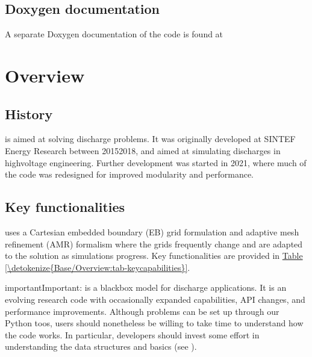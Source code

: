 \documentclass[letterpaper,10pt,english]{sphinxmanual}
\begin{document}
\subsection{Doxygen documentation}
\label{\detokenize{Base/Documentation:doxygen-documentation}}
A separate Doxygen documentation of the  code is found at 


\section{Overview}
\label{\detokenize{Base/Overview:overview}}\label{\detokenize{Base/Overview:chap-overview}}\label{\detokenize{Base/Overview::doc}}

\subsection{History}
\label{\detokenize{Base/Overview:history}}
 is aimed at solving discharge problems.
It was originally developed at SINTEF Energy Research between 2015\sphinxhyphen{}2018, and aimed at simulating discharges in high\sphinxhyphen{}voltage engineering.
Further development was started in 2021, where much of the code was redesigned for improved modularity and performance.


\subsection{Key functionalities}
\label{\detokenize{Base/Overview:key-functionalities}}
 uses a Cartesian embedded boundary (EB) grid formulation and adaptive mesh refinement (AMR) formalism where the grids frequently change and are adapted to the solution as simulations progress.
Key functionalities are provided in \hyperref[\detokenize{Base/Overview:tab-keycapabilities}]{Table \ref{\detokenize{Base/Overview:tab-keycapabilities}}}.

\begin{sphinxadmonition}{important}{Important:}
 is  a black\sphinxhyphen{}box model for discharge applications.
It is an evolving research code with occasionally expanded capabilities, API changes, and performance improvements.
Although problems can be set up through our Python toos, users should nonetheless be willing to take time to understand how the code works.
In particular, developers should invest some effort in understanding the data structures and  basics (see {\hyperref[\detokenize{Source/ChomboBasics:chap-basics}]{}}).
\end{sphinxadmonition}
\end{document}
